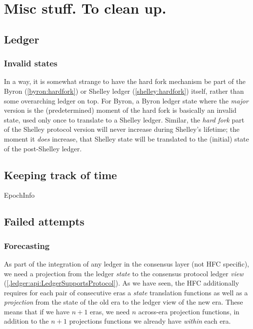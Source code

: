 \chapter{Misc stuff. To clean up.}
\label{hfc:misc}


\section{Ledger}

\subsection{Invalid states}
\label{hfc:ledger:invalid-states}

In a way, it is somewhat strange to have the hard fork mechanism be part of the
Byron (\cref{byron:hardfork}) or Shelley ledger (\cref{shelley:hardfork})
itself, rather than some overarching ledger on top. For Byron, a Byron ledger
state where the \emph{major} version is the (predetermined) moment of the hard
fork is basically an invalid state, used only once to translate to a Shelley
ledger. Similar, the \emph{hard fork} part of the Shelley protocol version will
never increase during Shelley's lifetime; the moment it \emph{does} increase,
that Shelley state will be translated to the (initial) state of the post-Shelley
ledger.

\section{Keeping track of time}
\label{hfc:time}

EpochInfo

\section{Failed attempts}

\subsection{Forecasting}

As part of the integration of any ledger in the consensus layer (not HFC
specific), we need a projection from the ledger \emph{state} to the consensus
protocol ledger \emph{view}
(\cref{,ledger:api:LedgerSupportsProtocol}).
As we have seen,
the HFC additionally requires for each pair of consecutive eras a  \emph{state}
translation functions as well as a \emph{projection} from the state of the old
era to the ledger view of the new era. These means that if we have $n + 1$ eras,
we need $n$ across-era projection functions, in addition to the $n + 1$
projections functions we already have \emph{within} each era.

